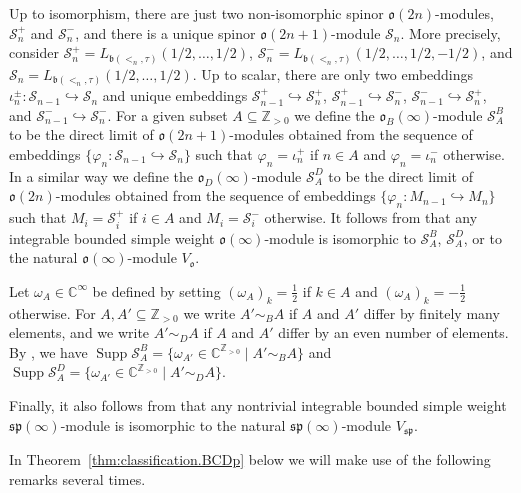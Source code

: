 \documentclass[12pt]{amsart}
\newcommand\C{\mathbb{C}}
\newcommand\Z{\mathbb{Z}}
\newcommand\fb{\mathfrak{b}}
\newcommand\fsp{\mathfrak{sp}}
\newcommand\fo{\mathfrak{o}}
\newcommand\cS{\mathcal{S}}
\DeclareMathOperator{\Supp}{Supp} %
\theoremstyle{plain}
\theoremstyle{definition}
\numberwithin{equation}{section}
\begin{document}
Up to isomorphism, there are just two non-isomorphic spinor $\fo(2n)$-modules, $\cS_n^+$ and $\cS_n^-$, and there is a unique spinor $\fo(2n+1)$-module $\cS_n$. More precisely, consider $\cS_n^+ = L_{\fb(<_n, \tau)}(1/2,\ldots, 1/2)$, $\cS_n^- = L_{\fb(<_n, \tau)}(1/2,\ldots, 1/2,-1/2)$, and $\cS_n = L_{\fb(<_n, \tau)}(1/2,\ldots, 1/2)$.  Up to scalar, there are only two embeddings $\iota_{n}^\pm : \cS_{n-1}\hookrightarrow \cS_n$ and unique embeddings $\cS_{n-1}^+\hookrightarrow \cS_n^+$, $\cS_{n-1}^+\hookrightarrow \cS_n^-$, $\cS_{n-1}^-\hookrightarrow \cS_n^+$, and $\cS_{n-1}^-\hookrightarrow \cS_n^-$. For a given subset $A\subseteq \Z_{>0}$ we define the $\fo_B(\infty)$-module $\cS_A^B$ to be the direct limit of $\fo(2n+1)$-modules obtained from the sequence of embeddings $\{\varphi_n: \cS_{n-1}\hookrightarrow \cS_n\}$ such that $\varphi_n=\iota_n^+$ if $n\in A$ and $\varphi_n=\iota_n^-$ otherwise. In a similar way we define the $\fo_D(\infty)$-module $\cS_A^D$ to be the direct limit of $\fo(2n)$-modules obtained from the sequence of embeddings $\{\varphi_n:M_{n-1}\hookrightarrow M_n\}$ such that $M_i=\cS_i^+$ if $i\in A$ and $M_i=\cS_i^-$ otherwise. It follows from \cite[Proposition~5.3 and Theorem~5.5]{GP20} that any integrable bounded simple weight $\fo(\infty)$-module is isomorphic to $\cS_A^B$, $\cS_A^D$, or to the natural $\fo(\infty)$-module $V_\fo$.

Let $\omega_A\in \C^\infty$ be defined by setting $(\omega_A)_k =\frac{1}{2}$ if $k\in A$ and $(\omega_A)_k =-\frac{1}{2}$ otherwise. For  $A, A'\subseteq \Z_{>0}$ we write $A'\sim_B A$ if $A$ and $A'$ differ by finitely many elements, and we write $A'\sim_D A$ if $A$ and $A'$ differ by an even number of elements. By \cite[\S~5.2]{GP20}, we have $\Supp \cS_A^B=\{\omega_{A'} \in \C^{\Z_{>0}} \mid  A'\sim_B A\}$ and $\Supp \cS_A^D=\{\omega_{A'} \in \C^{\Z_{>0}} \mid A'\sim_D A\}$.

Finally, it also follows from \cite[Proposition~5.7]{GP20} that any nontrivial integrable bounded simple weight $\fsp(\infty)$-module is isomorphic to the natural $\fsp(\infty)$-module $V_\fsp$.  


In Theorem~\ref{thm:classification.BCDp} below we will make use of the following remarks several times.
\end{document}
